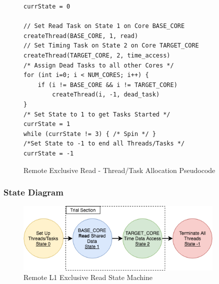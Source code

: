 \documentclass[bsc,frontabs,twoside,singlespacing,parskip,deptreport]{infthesis}     %
\begin{document}
\begin{figure}[!h]
    \centering
    \begin{minipage}{0.7\textwidth}
    \begin{verbatim}
currState = 0

// Set Read Task on State 1 on Core BASE_CORE
createThread(BASE_CORE, 1, read)
// Set Timing Task on State 2 on Core TARGET_CORE
createThread(TARGET_CORE, 2, time_access)
/* Assign Dead Tasks to all other Cores */
for (int i=0; i < NUM_CORES; i++) {
    if (i != BASE_CORE && i != TARGET_CORE)
        createThread(i, -1, dead_task)
}
/* Set State to 1 to get Tasks Started */
currState = 1
while (currState != 3) { /* Spin */ }
/*Set State to -1 to end all Threads/Tasks */
currState = -1
    \end{verbatim}
    \end{minipage}
    \caption{Remote Exclusive Read - Thread/Task Allocation Pseudocode}
    \label{fig:remote-E-read-pseudo}
\end{figure}

\newpage
\subsubsection{State Diagram}
\begin{figure}[!h]
    \centering
    \includegraphics[width=100mm]{ExclusiveState.png}
    \caption{Remote L1 Exclusive Read State Machine}
    \label{fig:remote-E-read-state}
\end{figure}
\end{document}
